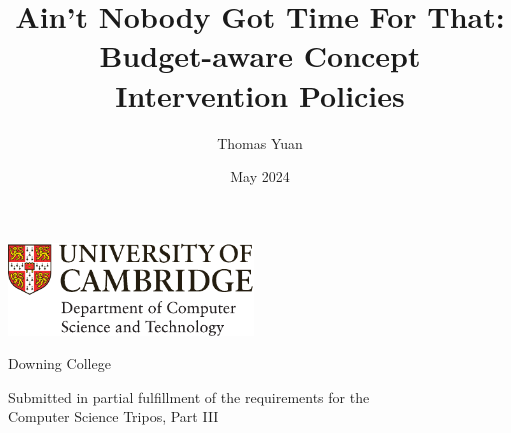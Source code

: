 \documentclass[12pt,a4paper,twoside]{report}
\title{Ain't Nobody Got Time For That: Budget-aware Concept Intervention Policies}
\author{Thomas Yuan}
\date{May 2024}
\newif\ifsubmission %
\newcommand{\candidatenumber}{2509T}
\newcommand{\college}{Downing College}
\newcommand{\course}{Computer Science Tripos, Part III}
\begin{document}

\begin{sffamily} %

\begin{titlepage}
\makeatletter

\hspace*{-14mm}\includegraphics[width=65mm]{logo-dcst-colour}

\ifsubmission

\begin{Large}
\vspace{20mm}
Research project report title page

\vspace{35mm}
Candidate \candidatenumber

\vspace{42mm}
\textsl{``\@title''}

\end{Large}

\else

\begin{center}
\Huge
\vspace{\fill}

\@title
\vspace{\fill}

\@author
\vspace{10mm}

\Large
\college
\vspace{\fill}

\@date
\vspace{\fill}

\end{center}

\fi

\vspace{\fill}
\begin{center}
Submitted in partial fulfillment of the requirements for the\\
\course
\end{center}

\makeatother
\end{titlepage}


\end{sffamily}
\end{document}
